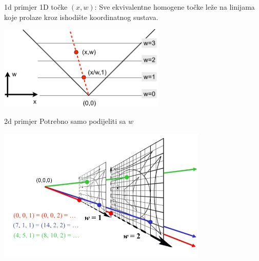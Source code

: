 \documentclass[9pt]{beamer}
\begin{document}
\begin{frame}{1d primjer}
	1D točke $(x,w)$: Sve ekvivalentne homogene točke leže na linijama koje prolaze kroz ishodište koordinatnog sustava.
	\begin{center}
		\includegraphics[height=4cm]{slike/homogenekoo_1d.png}
	\end{center}
\end{frame}

\begin{frame}{2d primjer}
	Potrebno samo podijeliti sa $w$
	\begin{center}
		\includegraphics[width=10cm]{slike/homogenekoo_2d.png}
	\end{center}
\end{frame}
\end{document}

